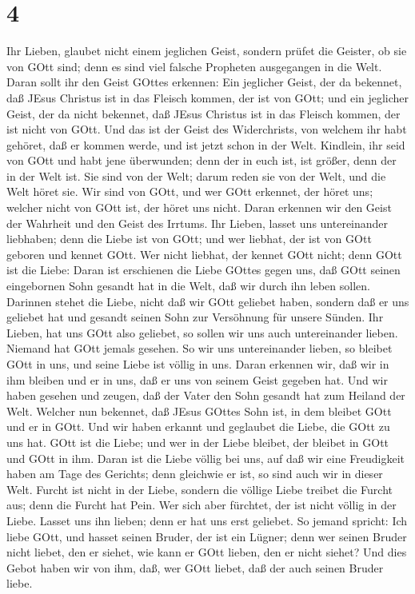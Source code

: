 \hypertarget{section-3}{%
\section{4}\label{section-3}}

 Ihr Lieben, glaubet nicht einem jeglichen Geist, sondern
prüfet die Geister, ob sie von GOtt sind; denn es sind viel falsche
Propheten ausgegangen in die Welt.  Daran sollt ihr den
Geist GOttes erkennen: Ein jeglicher Geist, der da bekennet, daß JEsus
Christus ist in das Fleisch kommen, der ist von GOtt;  und
ein jeglicher Geist, der da nicht bekennet, daß JEsus Christus ist in
das Fleisch kommen, der ist nicht von GOtt. Und das ist der Geist des
Widerchrists, von welchem ihr habt gehöret, daß er kommen werde, und ist
jetzt schon in der Welt.  Kindlein, ihr seid von GOtt und
habt jene überwunden; denn der in euch ist, ist größer, denn der in der
Welt ist.  Sie sind von der Welt; darum reden sie von der
Welt, und die Welt höret sie.  Wir sind von GOtt, und wer
GOtt erkennet, der höret uns; welcher nicht von GOtt ist, der höret uns
nicht. Daran erkennen wir den Geist der Wahrheit und den Geist des
Irrtums.  Ihr Lieben, lasset uns untereinander liebhaben;
denn die Liebe ist von GOtt; und wer liebhat, der ist von GOtt geboren
und kennet GOtt.  Wer nicht liebhat, der kennet GOtt nicht;
denn GOtt ist die Liebe:  Daran ist erschienen die Liebe
GOttes gegen uns, daß GOtt seinen eingebornen Sohn gesandt hat in die
Welt, daß wir durch ihn leben sollen.  Darinnen stehet die
Liebe, nicht daß wir GOtt geliebet haben, sondern daß er uns geliebet
hat und gesandt seinen Sohn zur Versöhnung für unsere Sünden.
 Ihr Lieben, hat uns GOtt also geliebet, so sollen wir uns
auch untereinander lieben.  Niemand hat GOtt jemals
gesehen. So wir uns untereinander lieben, so bleibet GOtt in uns, und
seine Liebe ist völlig in uns.  Daran erkennen wir, daß wir
in ihm bleiben und er in uns, daß er uns von seinem Geist gegeben hat.
 Und wir haben gesehen und zeugen, daß der Vater den Sohn
gesandt hat zum Heiland der Welt.  Welcher nun bekennet,
daß JEsus GOttes Sohn ist, in dem bleibet GOtt und er in GOtt.
 Und wir haben erkannt und geglaubet die Liebe, die GOtt zu
uns hat. GOtt ist die Liebe; und wer in der Liebe bleibet, der bleibet
in GOtt und GOtt in ihm.  Daran ist die Liebe völlig bei
uns, auf daß wir eine Freudigkeit haben am Tage des Gerichts; denn
gleichwie er ist, so sind auch wir in dieser Welt.  Furcht
ist nicht in der Liebe, sondern die völlige Liebe treibet die Furcht
aus; denn die Furcht hat Pein. Wer sich aber fürchtet, der ist nicht
völlig in der Liebe.  Lasset uns ihn lieben; denn er hat
uns erst geliebet.  So jemand spricht: Ich liebe GOtt, und
hasset seinen Bruder, der ist ein Lügner; denn wer seinen Bruder nicht
liebet, den er siehet, wie kann er GOtt lieben, den er nicht siehet?
 Und dies Gebot haben wir von ihm, daß, wer GOtt liebet,
daß der auch seinen Bruder liebe.

